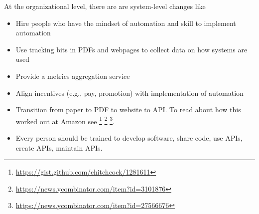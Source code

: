 At the organizational level, there are are system-level changes like
\begin{itemize}
    \item Hire people who have the mindset of automation and skill to implement automation
    \item Use tracking bits in PDFs and webpages to collect data on how systems are used
    \item Provide a metrics aggregation service
    \item Align incentives (e.g., pay, promotion) with implementation of automation
    \item Transition from paper to PDF to website to API. To read about how this worked out at Amazon see \footnote{\href{https://gist.github.com/chitchcock/1281611}{https://gist.github.com/chitchcock/1281611}}
    \footnote{\href{https://news.ycombinator.com/item?id=3101876}{https://news.ycombinator.com/item?id=3101876}}
    \footnote{\href{https://news.ycombinator.com/item?id=27566676}{https://news.ycombinator.com/item?id=27566676}}.
    
    \item Every person should be trained to develop software, share code, use APIs, create APIs, maintain APIs.
\end{itemize}

